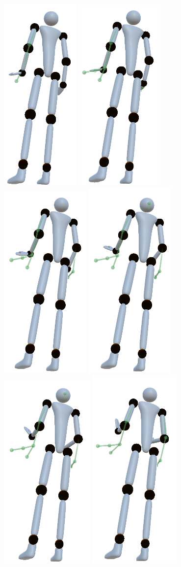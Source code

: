 \begin{figure}[th!]
	\centering
	\includegraphics[width=0.11\linewidth]{pictures/kwonSequence1.png}\hfill
	\includegraphics[width=0.12\linewidth]{pictures/kwonSequence2.png}\hfill
	\includegraphics[width=0.12\linewidth]{pictures/kwonSequence3.png}\hfill
	\includegraphics[width=0.12\linewidth]{pictures/kwonSequence4.png}\hfill
	\includegraphics[width=0.12\linewidth]{pictures/kwonSequence5.png}\hfill
	\includegraphics[width=0.12\linewidth]{pictures/kwonSequence6.png}\hfill

\end{figure}
